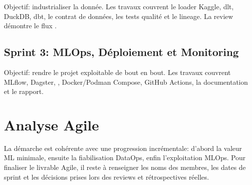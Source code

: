 Objectif: industrialiser la donnée. Les travaux couvrent le loader Kaggle, dlt, DuckDB, dbt, le contrat de données, les tests qualité et le lineage. La review démontre le flux .

\subsection{Sprint 3: MLOps, Déploiement et Monitoring}

Objectif: rendre le projet exploitable de bout en bout. Les travaux couvrent MLflow, Dagster, , Docker/Podman Compose, GitHub Actions, la documentation et le rapport.

\section{Analyse Agile}

La démarche est cohérente avec une progression incrémentale: d'abord la valeur ML minimale, ensuite la fiabilisation DataOps, enfin l'exploitation MLOps. Pour finaliser le livrable Agile, il reste à renseigner les noms des membres, les dates de sprint et les décisions prises lors des reviews et rétrospectives réelles.
